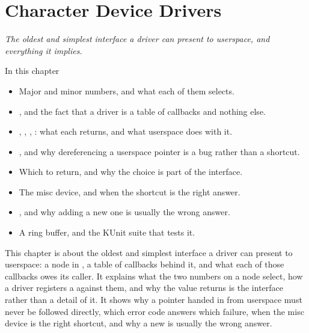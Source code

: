 
\chapter{Character Device Drivers}
\label{c5:ch}

{\large\itshape The oldest and simplest interface a driver can present to userspace, and everything
it implies.\par}

\begin{chapterbox}{In this chapter}
\begin{itemize}
  \item Major and minor numbers, and what each of them selects.
  \item {}, and the fact that a driver is a table of callbacks and
    nothing else.
  \item {}, , , : what each returns, and what
    userspace does with it.
  \item {}, and why dereferencing a userspace pointer is a bug rather than a
    shortcut.
  \item Which  to return, and why the choice is part of the interface.
  \item The misc device, and when the shortcut is the right answer.
  \item {}, and why adding a new one is usually the wrong answer.
  \item A ring buffer, and the KUnit suite that tests it.
\end{itemize}
\end{chapterbox}

This chapter is about the oldest and simplest interface a driver can present to userspace: a node in
, a table of callbacks behind it, and what each of those callbacks owes its caller. It
explains what the two numbers on a node select, how a driver registers a  against them, and why the value  returns is the interface rather than
a detail of it. It shows why a pointer handed in from userspace must never be followed directly,
which error code answers which failure, when the misc device is the right shortcut, and why a new
 is usually the wrong answer.

